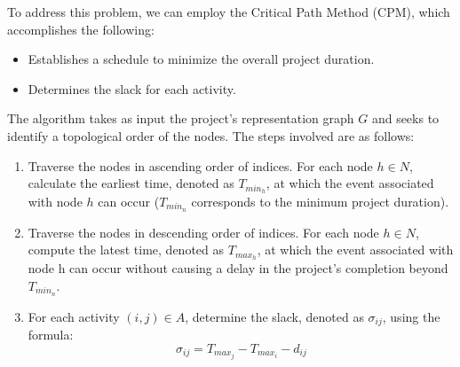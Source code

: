 \documentclass[12pt, a4paper]{report}
\begin{document}
    To address this problem, we can employ the Critical Path Method (CPM), which accomplishes the following:
    \begin{itemize}
        \item Establishes a schedule to minimize the overall project duration.
        \item Determines the slack for each activity.
    \end{itemize}
    The algorithm takes as input the project's representation graph $G$ and seeks to identify a topological order of the nodes. 
    The steps involved are as follows:
    \begin{enumerate}
        \item Traverse the nodes in ascending order of indices.
            For each node $h \in N$, calculate the earliest time, denoted as $T_{min_h}$, at which the event associated with node $h$ can occur ($T_{min_n}$ corresponds to the minimum project duration).
        \item Traverse the nodes in descending order of indices.
            For each node $h \in N$, compute the latest time, denoted as $T_{max_h}$, at which the event associated with node h can occur without causing a delay in the project's completion beyond $T_{min_n}$.
        \item For each activity $(i,j) \in A$, determine the slack, denoted as $\sigma_{ij}$, using the formula: 
            \[\sigma_{ij}=T_{max_j}-T_{max_i}-d_{ij}\]
    \end{enumerate}
\end{document}
